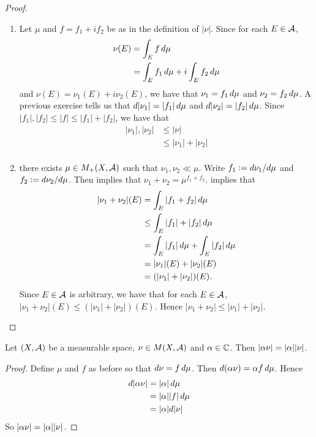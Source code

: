 \documentclass{book}
\begin{document}
	\begin{proof}\
		\begin{enumerate}
			\item Let $\mu$ and $f = f_1 + i f_2$ be as in the definition of $|\nu|$. Since for each $E \in \mathcal{A}$, 
			\begin{align*}
				\nu(E) 
				&= \int_E f \, d \mu\\
				&= \int_E f_1 \, d \mu + i \int_E f_2 \, d \mu
			\end{align*}
			and $\nu(E) = \nu_1(E) + i\nu_2(E)$, we have that $\nu_1 = f_1 \, d \mu$ and $\nu_2 = f_2 \, d \mu$. 
			A previous exercise tells us that $d|\nu_1| = |f_1|\, d \mu$ and $d |\nu_2| = |f_2|\, d \mu$. Since $|f_1|, |f_2| \leq |f| \leq |f_1|+|f_2|$, we have that 
			\begin{align*}
				|\nu_1|, |\nu_2| 
				&\leq |\nu| \\
				&\leq |\nu_1| + |\nu_2|\\
			\end{align*}
			\item {} there exists $\mu \in M_+(X, \mathcal{A})$ such that $\nu_1, \nu_2 \ll \mu$. Write $f_1 \vcentcolon= d \nu_1 / d \mu$ and $f_2 \vcentcolon= d \nu_2 / d \mu$. Then  implies that $\nu_1 + \nu_2 = \mu^{f_1 + f_2}$.  implies that 
			\begin{align*}
				|\nu_1 + \nu_2|(E)
				& = \int_E |f_1 + f_2| \, d \mu \\
				& \leq \int_E |f_1| + |f_2| \, d \mu \\
				& = \int_E |f_1|  \, d \mu + \int_E |f_2| \, d \mu \\
				& = |\nu_1|(E) + |\nu_2|(E) \\
				& = (|\nu_1| + |\nu_2|)(E).
			\end{align*}
			Since $E \in \mathcal{A}$ is arbitrary, we have that for each $E \in \mathcal{A}$, $|\nu_1 + \nu_2|(E) \leq (|\nu_1| + |\nu_2|)(E)$. Hence $|\nu_1 + \nu_2| \leq |\nu_1| + |\nu_2|$.
		\end{enumerate}
	\end{proof}
	
	\begin{ex}  
		Let  $(X, \mathcal{A})$ be a measurable space, $\nu \in M(X, \mathcal{A})$ and $\alpha \in \mathbb{C}$. Then $| \alpha \nu | = | \alpha | | \nu |$.
	\end{ex}
	
	\begin{proof}
		Define $\mu$ and $f$ as before so that $d \nu = f \, d \mu$. Then $d (\alpha \nu) = \alpha f \, d \mu$. Hence 
		\begin{align*}
			d | \alpha \nu | 
			&= | \alpha | \, d \mu \\
			&= | \alpha | | f | \, d \mu\\
			&= | \alpha | d| \nu |
		\end{align*}
		So $| \alpha \nu | = | \alpha | |  \nu |$.
	\end{proof}
\end{document}
